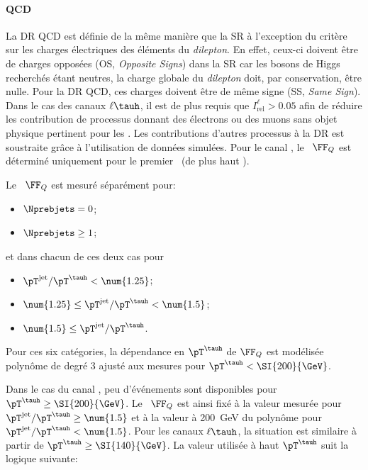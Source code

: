 \paragraph{QCD}
La DR QCD est définie de la même manière que la SR à l'exception du critère sur les charges électriques des éléments du \emph{dilepton}.
En effet, ceux-ci doivent être de charges opposées (OS, \emph{Opposite Signs}) dans la SR car les bosons de Higgs recherchés étant neutres, la charge globale du \emph{dilepton} doit, par conservation, être nulle.
Pour la DR QCD, ces charges doivent être de même signe (SS, \emph{Same Sign}).
Dans le cas des canaux $\ell\tauh$, il est de plus requis que $I_\text{rel}^{\ell} > \num{0.05}$ afin de réduire les contribution de processus donnant des électrons ou des muons sans objet physique pertinent pour les \fakefactors.
Les contributions d'autres processus à la DR est soustraite grâce à l'utilisation de données simulées.
Pour le canal \tauh\tauh, le \fakefactor\ $\FF_Q$ est déterminé uniquement pour le premier \tauh\ (de plus haut \pT).
\par
Le \fakefactor\ $\FF_Q$ est mesuré séparément pour:
\begin{itemize}
\item $\Nprebjets=0$;
\item $\Nprebjets\geq1$;
\end{itemize}
et dans chacun de ces deux cas pour
\begin{itemize}
\item $\pT^\text{jet}/\pT^{\tauh} < \num{1.25}$;
\item $\num{1.25} \leq \pT^\text{jet}/\pT^{\tauh} < \num{1.5}$;
\item $\num{1.5} \leq \pT^\text{jet}/\pT^{\tauh}$.
\end{itemize}
Pour ces six catégories, la dépendance en $\pT^{\tauh}$ de $\FF_Q$ est modélisée polynôme de degré 3 ajusté aux mesures pour $\pT^{\tauh}<\SI{200}{\GeV}$.
\par
Dans le cas du canal \tauh\tauh, peu d'événements sont disponibles pour $\pT^{\tauh}\geq\SI{200}{\GeV}$.
Le \fakefactor\ $\FF_Q$ est ainsi fixé à la valeur mesurée pour $\pT^\text{jet}/\pT^{\tauh} \geq \num{1.5}$ et à la valeur à \SI{200}{\GeV} du polynôme pour $\pT^\text{jet}/\pT^{\tauh} < \num{1.5}$.
Pour les canaux $\ell\tauh$, la situation est similaire à partir de $\pT^{\tauh}\geq\SI{140}{\GeV}$.
La valeur utilisée à haut $\pT^{\tauh}$ suit la logique suivante:
